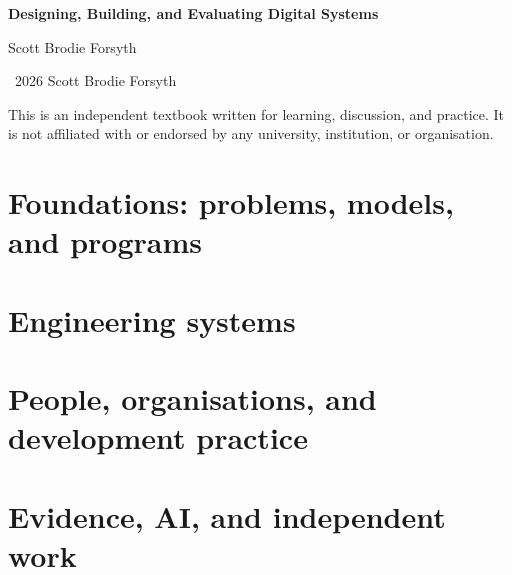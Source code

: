 \documentclass[11pt,oneside]{book}
\begin{document}
\frontmatter


\thispagestyle{empty}
\null\vfill
\begin{center}
{\large\bfseries Designing, Building, and Evaluating Digital Systems\par}
\vspace{6mm}
Scott Brodie Forsyth\par
\vspace{6mm}
\textcopyright\ 2026 Scott Brodie Forsyth\par
\vspace{8mm}
This is an independent textbook written for learning, discussion, and practice. It is not affiliated with or endorsed by any university, institution, or organisation.
\end{center}
\vfill\null
\cleardoublepage






\tableofcontents
\listoffigures
\mainmatter

\part{Foundations: problems, models, and programs}





\part{Engineering systems}







\part{People, organisations, and development practice}





\part{Evidence, AI, and independent work}




\end{document}
